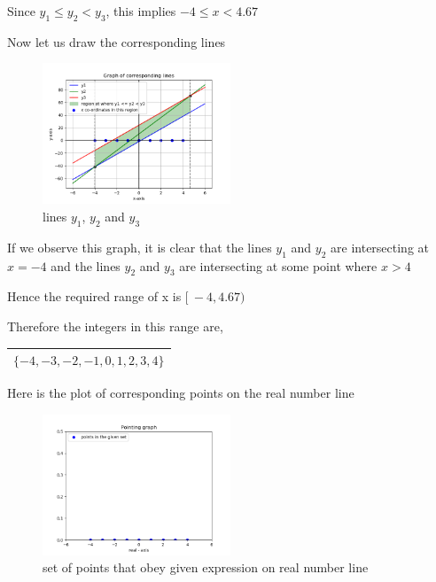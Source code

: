 \documentclass[16pt, a4paper, two column]{article}
\begin{document}
Since $y_1 \leq y_2 < y_3$, this implies $-4 \leq x < 4.67$
\vspace{16pt}


\noindent Now let us draw the corresponding lines

\begin{figure}[h]
    \centering
    \includegraphics[width = 0.5\textwidth]{Figure_1}
    \caption{lines $y_1$, $y_2$ and $y_3$}
    \label{fig:mesh1}
\end{figure}

\vspace{16pt}

If we observe this graph, it is clear that the lines $y_1$ and $y_2$ are intersecting at $x = -4$ and the lines $y_2$ and $y_3$ are intersecting at some point where $x>4$

Hence the required range of x is $[\ -4, 4.67)\ $\newline


\vspace{10pt}
\noindent Therefore the integers in this range are,

\begin{center}
\begin{tabular}{|c|}
\hline
\textbf{$ \{ -4, -3, -2, -1, 0, 1, 2, 3, 4\}$} \\
\hline
\end{tabular}
\end{center}


\noindent Here is the plot of corresponding points on the real number line\\
\begin{figure}[h]
    \centering
    \includegraphics[width = 0.5\textwidth]{Figure_2}
    \caption{set of points that obey given expression on real number line}
    \label{fig:mesh1}
\end{figure}
\end{document}
